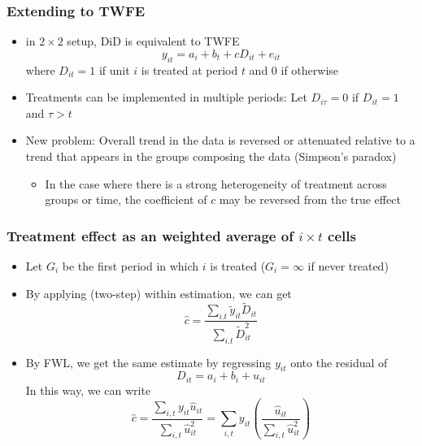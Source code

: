 \documentclass[aspectratio=169]{beamer}
\begin{document}
\begin{frame}
\frametitle{Extending to TWFE}
\begin{itemize}
\item in $2\times2$ setup, DiD is equivalent to TWFE
\[
y_{it}=a_i+b_t + cD_{it}+e_{it}
\]
where $D_{it}=1$ if unit $i$ is treated at period $t$ and $0$ if otherwise
\item Treatments can be implemented in multiple periods: Let $D_{i\tau}=0$ if $D_{it}=1$ and $\tau>t$
\item New problem: Overall trend in the data is reversed or attenuated relative to a trend that appears in the groups composing the data (Simpson's paradox)
\begin{itemize}
\item In the case where there is a strong heterogeneity of treatment across groups or time, the coefficient of $c$ may be reversed from the true effect
\end{itemize}
\end{itemize}
\end{frame}

\begin{frame}
\frametitle{Treatment effect as an weighted average of $i\times t$ cells}
\begin{itemize}
\item Let $G_i$ be the first period in which $i$ is treated ($G_i=\infty$ if never treated)
\item  By applying (two-step) within estimation, we can get
\[
\hat{c} = \frac{\sum_{i.t}\tilde{y}_{it}\widetilde{D}_{it}}{\sum_{i.t}\widetilde{D}_{it}^2}
\]
\item By FWL, we get the same estimate by regressing $y_{it}$ onto the residual of 
\[
D_{it} = a_i+b_i+u_{it} 
\]
In this way, we can write
\[
\hat{c}=\frac{\sum_{i,t}y_{it}\hat{u}_{it}}{\sum_{i,t}\hat{u}_{it}^2}=\sum_{i,t}y_{it}\left(\frac{\hat{u}_{it}}{\sum_{i,t}\hat{u}_{it}^2}\right)
\]
\end{itemize}
\end{frame}
\end{document}
